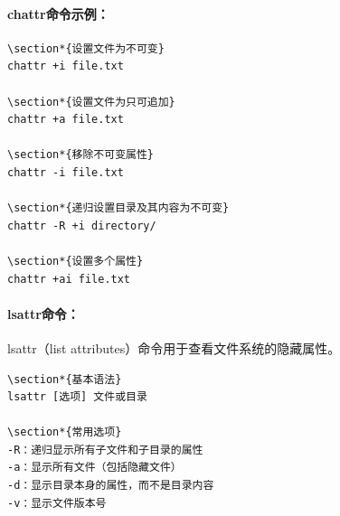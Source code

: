 \documentclass[12pt,UTF8]{ctexbook}
\begin{document}
\paragraph{chattr命令示例：}
\begin{verbatim}
\section*{设置文件为不可变}
chattr +i file.txt

\section*{设置文件为只可追加}
chattr +a file.txt

\section*{移除不可变属性}
chattr -i file.txt

\section*{递归设置目录及其内容为不可变}
chattr -R +i directory/

\section*{设置多个属性}
chattr +ai file.txt
\end{verbatim}

\paragraph{lsattr命令：}
lsattr（list attributes）命令用于查看文件系统的隐藏属性。

\begin{verbatim}
\section*{基本语法}
lsattr [选项] 文件或目录

\section*{常用选项}
-R：递归显示所有子文件和子目录的属性
-a：显示所有文件（包括隐藏文件）
-d：显示目录本身的属性，而不是目录内容
-v：显示文件版本号
\end{verbatim}
\end{document}
